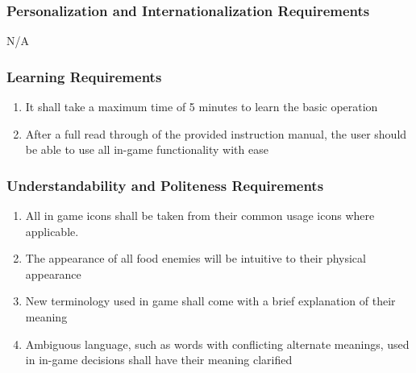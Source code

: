\documentclass[12pt, titlepage]{article}
\begin{document}
\subsubsection{Personalization and Internationalization Requirements}
\label{ssub:personalization_and_internationalization_requirements}
N/A

\subsubsection{Learning Requirements}
\label{ssub:learning_requirements}
\begin{enumerate}[start=2,label={ UH\arabic*.}]
        \item It shall take a maximum time of 5 minutes to learn the basic operation
        \item After a full read through of the provided instruction manual, the user should be able to use all in-game functionality with ease
\end{enumerate}

\subsubsection{Understandability and Politeness Requirements}
\label{ssub:understandability_and_politeness_requirements}
\begin{enumerate}[start=4,label={ UH\arabic*.}]
        \item All in game icons shall be taken from their common usage icons where applicable.
        \item The appearance of all food enemies will be intuitive to their physical appearance
        \item New terminology used in game shall come with a brief explanation of their meaning
        \item Ambiguous language, such as words with conflicting alternate meanings, used in in-game decisions shall have their meaning clarified

\end{enumerate}
\end{document}
